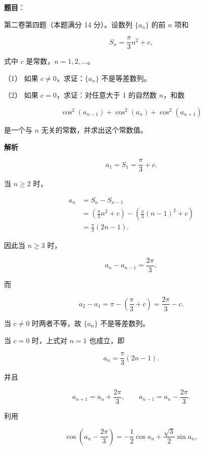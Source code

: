 \begin{answer}

\textbf{题目}：

第二卷第四题（本题满分 14 分）。设数列 $\{a_n\}$ 的前 $n$ 项和

\nopagebreak[4]
\[
S_n=\frac\pi3n^2+c,
\]

式中 $c$ 是常数，$n=1,2,\ldots$。

（1） 如果 $c\ne0$，求证：$\{a_n\}$ 不是等差数列。

（2） 如果 $c=0$，求证：对任意大于 1 的自然数 $n$，和数

\nopagebreak[4]
\[
\cos^2(a_{n-1})+\cos^2(a_n)+\cos^2(a_{n+1})
\]

是一个与 $n$ 无关的常数，并求出这个常数值。

\textbf{解析}


\nopagebreak[4]
\[
a_1=S_1=\frac\pi3+c.
\]

当 $n\ge2$ 时，

\nopagebreak[4]
\[
\begin{aligned}
a_n
&=S_n-S_{n-1}\\
&=\left(\frac\pi3n^2+c\right)
-\left(\frac\pi3(n-1)^2+c\right)\\
&=\frac\pi3(2n-1).
\end{aligned}
\]

因此当 $n\ge3$ 时，

\nopagebreak[4]
\[
a_n-a_{n-1}=\frac{2\pi}{3},
\]

而

\nopagebreak[4]
\[
a_2-a_1=\pi-\left(\frac\pi3+c\right)
=\frac{2\pi}{3}-c.
\]

当 $c\ne0$ 时两者不等，故 $\{a_n\}$ 不是等差数列。


当 $c=0$ 时，上式对 $n=1$ 也成立，即

\nopagebreak[4]
\[
a_n=\frac\pi3(2n-1).
\]

并且

\nopagebreak[4]
\[
a_{n+1}=a_n+\frac{2\pi}{3},\qquad
a_{n-1}=a_n-\frac{2\pi}{3}.
\]

利用

\nopagebreak[4]
\[
\cos\left(a_n-\frac{2\pi}{3}\right)
=-\frac12\cos a_n+\frac{\sqrt3}{2}\sin a_n,
\]


\end{answer}
